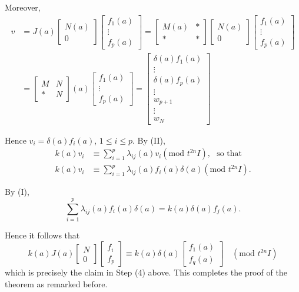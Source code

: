 Moreover,
\begin{align*}
v &= J(a)
\begin{bmatrix}
N(a)\\
0
\end{bmatrix}
\begin{bmatrix}
f_{1}(a)\\
\vdots\\
f_{p}(a)
\end{bmatrix}
=
\begin{bmatrix}
M(a) & *\\
* & *
\end{bmatrix}
\begin{bmatrix}
N(a)\\
0
\end{bmatrix}
\begin{bmatrix}
f_{1}(a)\\
\vdots\\
f_{p}(a)
\end{bmatrix}\\
&= 
\begin{bmatrix}
M & N\\
* & N
\end{bmatrix}
(a)
\begin{bmatrix}
f_{1}(a)\\
\vdots\\
f_{p}(a)
\end{bmatrix}
=
\begin{bmatrix}
\delta(a)f_{1}(a)\\
\vdots\\
\delta(a)f_{p}(a)\\
\vdots\\
w_{p+1}\\
\vdots\\
w_{N}
\end{bmatrix}
\end{align*}

Hence $v_{i}=\delta(a)f_{i}(a)$, $1\leq i\leq p$. By (II),
\begin{align*}
k(a)v_{i} &\equiv
\sum^{p}_{i=1}\lambda_{ij}(a)v_{i}(\text{mod~}t^{2n}I),\text{~ so
  that}\\
k(a)v_{i} &\equiv
\sum^{p}_{i=1}\lambda_{ij}(a)f_{i}(a)\delta(a)(\text{mod~}t^{2n}I). 
\end{align*}

By (I),
$$
\sum^{p}_{i=1}\lambda_{ij}(a)f_{i}(a)\delta(a)=k(a)\delta(a)f_{j}(a).
$$

Hence it follows that
$$
k(a)J(a)
\begin{bmatrix}
N\\
0
\end{bmatrix}
\begin{bmatrix}
f_{i}\\
f_{p}
\end{bmatrix}
\equiv k(a)\delta(a)
\begin{bmatrix}
f_{1}(a)\\
f_{q}(a)
\end{bmatrix}
\quad(\text{mod~}t^{2n}I)
$$\pageoriginale
which is precisely the claim in Step (4) above. This completes the
proof of the theorem as remarked before.

